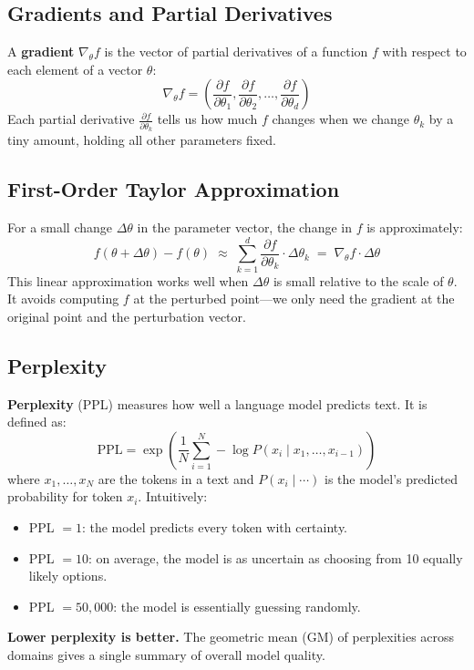 \documentclass[11pt,letterpaper]{article}
\theoremstyle{definition}
\begin{document}
\subsection{Gradients and Partial Derivatives}

A \textbf{gradient} $\nabla_\theta f$ is the vector of partial derivatives of a function $f$ with respect to each element of a vector $\theta$:
\[
\nabla_\theta f = \left(\frac{\partial f}{\partial \theta_1}, \frac{\partial f}{\partial \theta_2}, \ldots, \frac{\partial f}{\partial \theta_d}\right)
\]
Each partial derivative $\frac{\partial f}{\partial \theta_k}$ tells us how much $f$ changes when we change $\theta_k$ by a tiny amount, holding all other parameters fixed.

\subsection{First-Order Taylor Approximation}

For a small change $\Delta\theta$ in the parameter vector, the change in $f$ is approximately:
\begin{equation}
f(\theta + \Delta\theta) - f(\theta) \;\approx\; \sum_{k=1}^d \frac{\partial f}{\partial \theta_k} \cdot \Delta\theta_k \;=\; \nabla_\theta f \cdot \Delta\theta
\label{eq:taylor}
\end{equation}
This linear approximation works well when $\Delta\theta$ is small relative to the scale of $\theta$. It avoids computing $f$ at the perturbed point---we only need the gradient at the original point and the perturbation vector.

\subsection{Perplexity}

\textbf{Perplexity} (PPL) measures how well a language model predicts text. It is defined as:
\[
\text{PPL} = \exp\!\left(\frac{1}{N} \sum_{i=1}^N -\log P(x_i \mid x_1, \ldots, x_{i-1})\right)
\]
where $x_1, \ldots, x_N$ are the tokens in a text and $P(x_i \mid \cdots)$ is the model's predicted probability for token $x_i$. Intuitively:
\begin{itemize}[nosep]
  \item PPL $= 1$: the model predicts every token with certainty.
  \item PPL $= 10$: on average, the model is as uncertain as choosing from 10 equally likely options.
  \item PPL $= 50{,}000$: the model is essentially guessing randomly.
\end{itemize}
\textbf{Lower perplexity is better.} The geometric mean (GM) of perplexities across domains gives a single summary of overall model quality.
\end{document}
